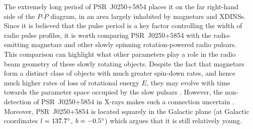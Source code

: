 The extremely long period of PSR~J0250+5854 places it on the far right-hand side of the $P$-$\dot{P}$ diagram, in an area largely inhabited by magnetars and XDINSs. Since it is believed that the pulse period is a key factor controlling the width of radio pulse profiles, it is worth comparing PSR~J0250+5854 with the radio-emitting magnetars and other slowly spinning rotation-powered radio pulsars. This comparison can highlight what other parameters play a role in the radio beam geometry of these slowly rotating objects.  Despite the fact that magnetars form a distinct class of objects with much greater spin-down rates, and hence much higher rates of loss of rotational energy $\dot{E}$, they may evolve with time towards the parameter space occupied by the slow pulsars \citep[e.g.][]{VRP+2013}. However, the non-detection of PSR~J0250+5854 in X-rays makes such a connection uncertain \citep{TBC+2018}. Moreover, PSR~J0250+5854 is located squarely in the Galactic plane (at Galactic coordinates $l=137.7^\circ$, $b=-0.5^\circ$) which argues that it is still relatively young.

